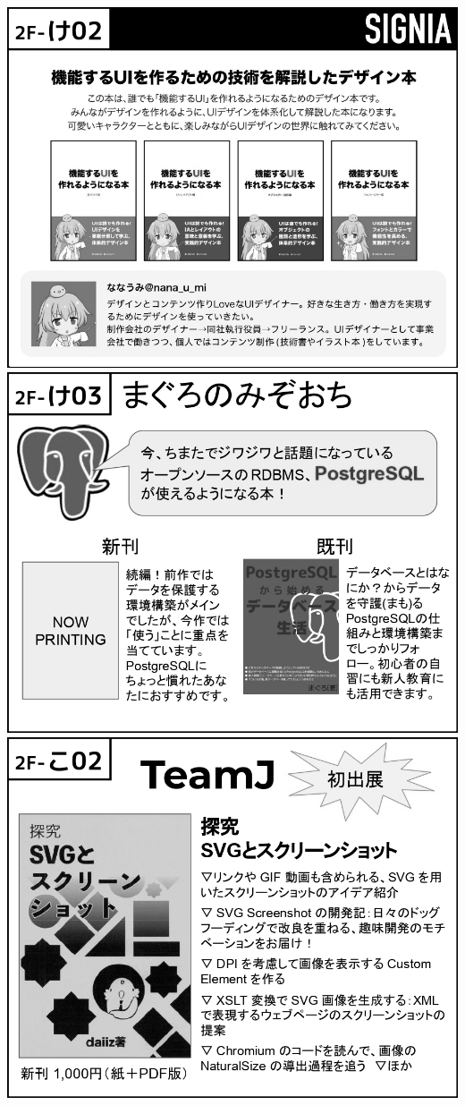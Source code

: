 \begin{center}
\includegraphics[width=0.9\linewidth]{images/circle-appeals/2F-け02.jpg}
\includegraphics[width=0.9\linewidth]{images/circle-appeals/2F-け03.jpg}
\includegraphics[width=0.9\linewidth]{images/circle-appeals/2F-こ02.jpg}

\end{center}
